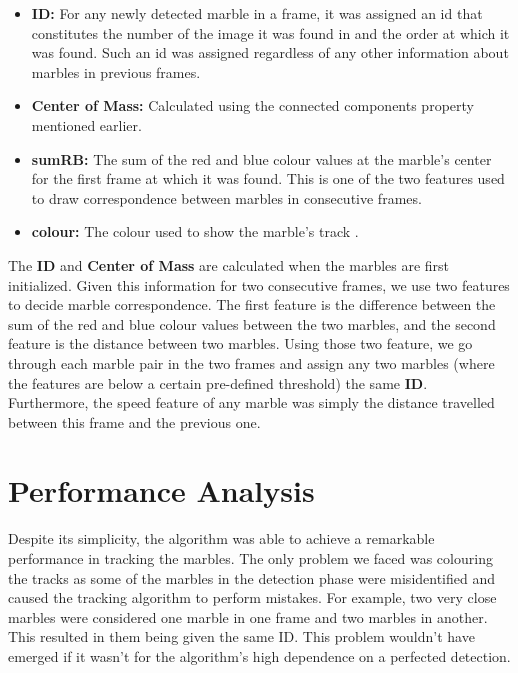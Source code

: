 \documentclass[10pt,a4paper,onecolumn]{report}
\begin{document}
\begin{itemize}
\item \textbf{ID:} For any newly detected marble in a frame, it was assigned an id that constitutes the number of the image it was found in and the order at which it was found. Such an id was assigned regardless of any other information about marbles in previous frames.

\item \textbf{Center of Mass:}  Calculated using the connected components property mentioned earlier.

\item \textbf{sumRB:} The sum of the red and blue colour values at the marble's center for the first frame at which it was found. This is one of the two features used to draw correspondence between marbles in consecutive frames.

\item \textbf{colour:} The colour used to show the marble's track .
\end{itemize}

The \textbf{ID} and \textbf{Center of Mass} are calculated when the marbles are first initialized. Given this information for two consecutive frames, we use two features to decide marble correspondence. The first feature is the difference between the sum of the red and blue colour values between the two marbles, and the second feature is the distance between two marbles. Using those two feature, we go through each marble pair in the two frames and assign any two marbles (where the features are below a certain pre-defined threshold) the same \textbf{ID}. Furthermore, the speed feature of any marble was simply the distance travelled between this frame and the previous one.

\section{Performance Analysis}

Despite its simplicity, the algorithm was able to achieve a remarkable performance in tracking the marbles. The only problem we faced was colouring the tracks as some of the marbles in the detection phase were misidentified and caused the tracking algorithm to perform mistakes. For example, two very close marbles were considered one marble in one frame and two marbles in another. This resulted in them being given the same ID. This problem wouldn't have emerged if it wasn't for the algorithm's high dependence on a perfected detection.
\end{document}
